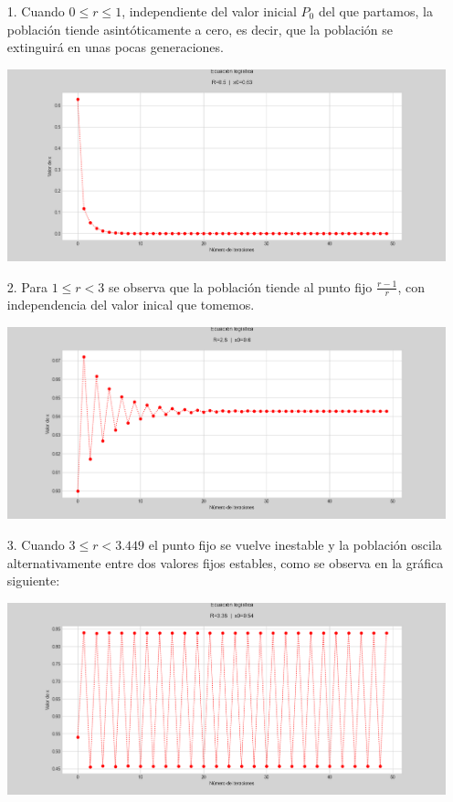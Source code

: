 \documentclass[10pt,a4paper]{article}
\begin{document}
\begin{itemize}
\item[1.] Cuando $0 \leq r \leq 1$, independiente del valor inicial $P_0$ del que partamos, la población tiende asintóticamente a cero, es decir, que la población se extinguirá en unas pocas generaciones. 

\includegraphics[scale=0.5]{Graf_1.png} 

\item[2.] Para $1 \leq r < 3$ se observa que la población tiende al punto fijo $\frac{r-1}{r}$, con independencia del valor inical que tomemos.

\includegraphics[scale=0.5]{Graf_2.png} 

\item[3.] Cuando $3 \leq r < 3.449$ el punto fijo se vuelve inestable y la población oscila alternativamente entre dos valores fijos estables, como se observa en la gráfica siguiente:

\includegraphics[scale=0.5]{Graf_3.png} 


\end{itemize}
\end{document}
